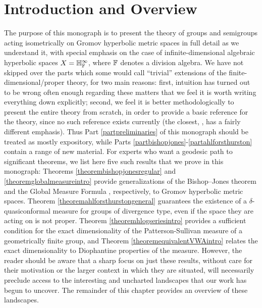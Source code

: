 \chapter{Introduction and Overview}

The purpose of this monograph is to present the theory of groups and semigroups acting isometrically on Gromov hyperbolic metric spaces in full detail as we understand it, with special emphasis on the case of infinite-dimensional algebraic hyperbolic spaces $X = \H_\F^\infty$, where $\F$ denotes a division algebra. We have not skipped over the parts which some would call ``trivial'' extensions of the finite-dimensional/proper theory, for two main reasons: first, intuition has turned out to be wrong often enough regarding these matters that we feel it is worth writing everything down explicitly; second, we feel it is better methodologically to present the entire theory from scratch, in order to provide a basic reference for the theory, since no such reference exists currently (the closest, \cite{BridsonHaefliger}, has a fairly different emphasis). Thus Part \ref{partpreliminaries} of this monograph should be treated as mostly expository, while Parts \ref{partbishopjones}-\ref{partahlforsthurston} contain a range of new material. For experts who want a geodesic path to significant theorems, we list here five such results that we prove in this monograph: Theorems \ref{theorembishopjonesregular} and \ref{theoremglobalmeasureintro} provide generalizations of the Bishop--Jones theorem \cite[Theorem 1]{BishopJones} and the Global Measure Formula \cite[Theorem 2]{StratmannVelani}, respectively, to Gromov hyperbolic metric spaces. Theorem \ref{theoremahlforsthurstongeneral} guarantees the existence of a $\delta$-quasiconformal measure for groups of divergence type, even if the space they are acting on is not proper. Theorem \ref{theoremhlogseriesintro} provides a sufficient condition for the exact dimensionality of the Patterson-Sullivan measure of a geometrically finite group, and Theorem  \ref{theoremequivalentVWAintro} relates the exact dimensionality to Diophantine properties of the measure. However, the reader should be aware that a sharp focus on just these results, without care for their motivation or the larger context in which they are situated, will necessarily preclude access to the interesting and uncharted landscapes that our work has begun to uncover. The remainder of this chapter provides an overview of these landscapes.
